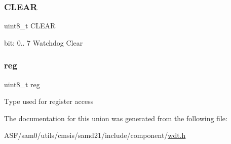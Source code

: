 \subsubsection{\texorpdfstring{CLEAR}{CLEAR}}
{\footnotesize\ttfamily uint8\+\_\+t C\+L\+E\+AR}

bit\+: 0.. 7 Watchdog Clear \mbox{\label{union_w_d_t___c_l_e_a_r___type_a9428adc9af4653a2050e2536b55dec8d}} 
\subsubsection{\texorpdfstring{reg}{reg}}
{\footnotesize\ttfamily uint8\+\_\+t reg}

Type used for register access 

The documentation for this union was generated from the following file\+:\begin{DoxyCompactItemize}
\item 
A\+S\+F/sam0/utils/cmsis/samd21/include/component/\mbox{\hyperlink{component_2wdt_8h}{wdt.\+h}}\end{DoxyCompactItemize}
